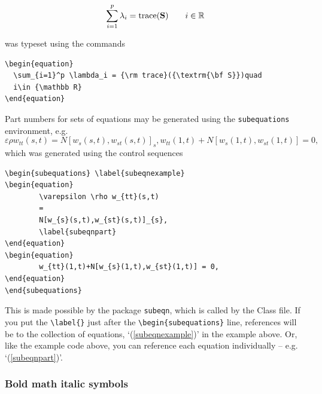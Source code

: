\documentclass[]{tGIS2e}
\begin{document}
\begin{equation}
  \sum_{i=1}^p \lambda_i = {\rm trace}({\textrm{\bf S}})\qquad
  i\in {\mathbb R}
\end{equation}

was typeset using the commands

\begin{verbatim}
\begin{equation}
  \sum_{i=1}^p \lambda_i = {\rm trace}({\textrm{\bf S}})quad
  i\in {\mathbb R}
\end{equation}
\end{verbatim}

Part numbers for sets of equations may be generated using the
{\tt{subequations}} environment, e.g.
\begin{subequations} \label{subeqnexample}
\begin{equation}
        \varepsilon \rho w_{tt}(s,t)
        =
        N[w_{s}(s,t),w_{st}(s,t)]_{s},
        \label{subeqnpart}
\end{equation}
\begin{equation}
        w_{tt}(1,t)+N[w_{s}(1,t),w_{st}(1,t)] = 0,
\end{equation}
\end{subequations}
which was generated using the control sequences

\begin{verbatim}
\begin{subequations} \label{subeqnexample}
\begin{equation}
        \varepsilon \rho w_{tt}(s,t)
        =
        N[w_{s}(s,t),w_{st}(s,t)]_{s},
        \label{subeqnpart}
\end{equation}
\begin{equation}
        w_{tt}(1,t)+N[w_{s}(1,t),w_{st}(1,t)] = 0,
\end{equation}
\end{subequations}
\end{verbatim}
This is made possible by the package {\tt{subeqn}}, which is called
by the Class file. If you put the \verb"\label{}" just after the
\verb"\begin{subequations}" line, references will be to the
collection of equations, `(\ref{subeqnexample})' in the example
above. Or, like the example code above, you can reference each
equation individually -- e.g. `(\ref{subeqnpart})'.

\subsubsection{Bold math italic symbols}
\end{document}
